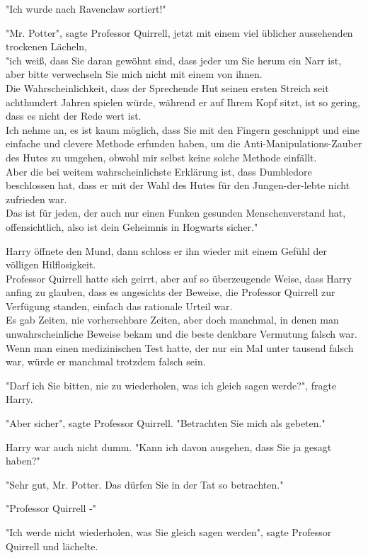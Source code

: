 {"Ich wurde nach Ravenclaw sortiert!"

"Mr. Potter", sagte Professor Quirrell, jetzt mit einem viel üblicher aussehenden trockenen Lächeln,\\ "ich weiß, dass Sie daran gewöhnt sind, dass jeder um Sie herum ein Narr ist, aber bitte verwechseln Sie mich nicht mit einem von ihnen.\\ Die Wahrscheinlichkeit, dass der Sprechende Hut seinen ersten Streich seit achthundert Jahren spielen würde, während er auf Ihrem Kopf sitzt, ist so gering, dass es nicht der Rede wert ist.\\ Ich nehme an, es ist kaum möglich, dass Sie mit den Fingern geschnippt und eine einfache und clevere Methode erfunden haben, um die Anti-Manipulations-Zauber des Hutes zu umgehen, obwohl mir selbst keine solche Methode einfällt.\\ Aber die bei weitem wahrscheinlichste Erklärung ist, dass Dumbledore beschlossen hat, dass er mit der Wahl des Hutes für den Jungen-der-lebte nicht zufrieden war.\\ Das ist für jeden, der auch nur einen Funken gesunden Menschenverstand hat, offensichtlich, also ist dein Geheimnis in Hogwarts sicher."

Harry öffnete den Mund, dann schloss er ihn wieder mit einem Gefühl der völligen Hilflosigkeit.\\ Professor Quirrell hatte sich geirrt, aber auf so überzeugende Weise, dass Harry anfing zu glauben, dass es angesichts der Beweise, die Professor Quirrell zur Verfügung standen, einfach das rationale Urteil war.\\ Es gab Zeiten, nie vorhersehbare Zeiten, aber doch manchmal, in denen man unwahrscheinliche Beweise bekam und die beste denkbare Vermutung falsch war.\\ Wenn man einen medizinischen Test hatte, der nur ein Mal unter tausend falsch war, würde er manchmal trotzdem falsch sein.

"Darf ich Sie bitten, nie zu wiederholen, was ich gleich sagen werde?", fragte Harry.

"Aber sicher", sagte Professor Quirrell. "Betrachten Sie mich als gebeten."

Harry war auch nicht dumm. "Kann ich davon ausgehen, dass Sie ja gesagt haben?"

"Sehr gut, Mr. Potter. Das dürfen Sie in der Tat so betrachten."

"Professor Quirrell -"

"Ich werde nicht wiederholen, was Sie gleich sagen werden", sagte Professor Quirrell und lächelte.

}
